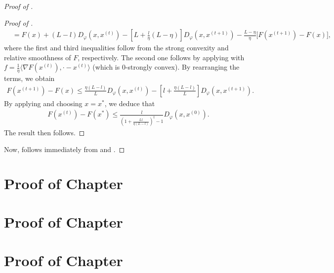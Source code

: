 \begin{proof}[Proof of ]
\begin{proof}[Proof of ]
\begin{align*}
    &= F(x) + (L - l) D_{\varphi}(x, x^{(t)})
    - \left[ L + \frac{l}{\eta}(L - \eta) \right] D_{\varphi}(x, x^{(t+1)})
    - \frac{L - \eta}{\eta} \big[ F(x^{(t+1)}) - F(x) \big],
\end{align*}
where the first and third inequalities follow from the strong convexity and
relative smoothness of $F$, respectively. The second one follows by applying
 with
$f = \frac{1}{\eta} \langle \nabla F(x^{(t)}), \cdot - x^{(t)} \rangle$
(which is $0$-strongly convex). By rearranging the terms, we obtain
\begin{align*}
    F(x^{(t+1)}) - F(x) \leq \frac{\eta(L-l)}{L} D_{\varphi}(x, x^{(t)})
    - \left[ l + \frac{\eta (L - l)}{L} \right] D_{\varphi}(x, x^{(t+1)}).
\end{align*}
By applying  and choosing $x = x^*$, we deduce that
\begin{align*}
    F(x^{(t)}) - F(x^*) \leq \frac{l}{\left( 1 + \frac{Ll }{\eta (L - l)} \right)^t - 1}
    D_{\varphi}(x, x^{(0)}).
\end{align*}
The result then follows.
\end{proof}
Now,  follows immediately from  and
.
\end{proof}

\section{Proof of Chapter }

\section{Proof of Chapter }

\section{Proof of Chapter }
